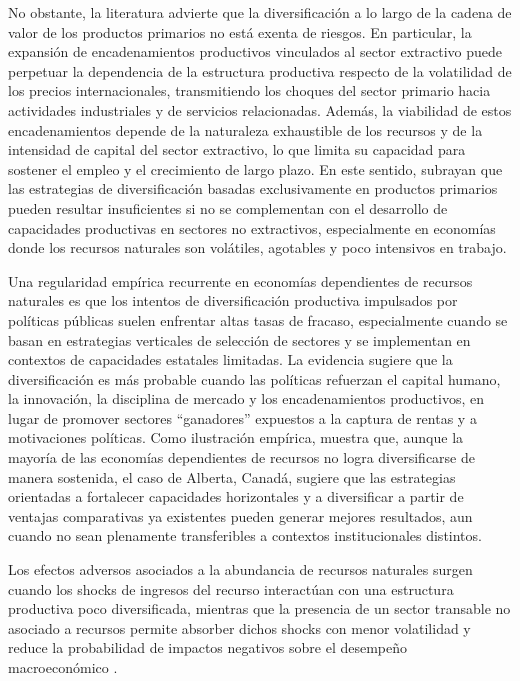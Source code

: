 \documentclass[../../TFM.tex]{subfiles}
\begin{document}
	No obstante, la literatura advierte que la diversificación a lo largo de la cadena de valor de los productos primarios no está exenta de riesgos. En particular, la expansión de encadenamientos productivos vinculados al sector extractivo puede perpetuar la dependencia de la estructura productiva respecto de la volatilidad de los precios internacionales, transmitiendo los choques del sector primario hacia actividades industriales y de servicios relacionadas. Además, la viabilidad de estos encadenamientos depende de la naturaleza exhaustible de los recursos y de la intensidad de capital del sector extractivo, lo que limita su capacidad para sostener el empleo y el crecimiento de largo plazo. En este sentido, \textcite{Lebdioui2019} subrayan que las estrategias de diversificación basadas exclusivamente en productos primarios pueden resultar insuficientes si no se complementan con el desarrollo de capacidades productivas en sectores no extractivos, especialmente en economías donde los recursos naturales son volátiles, agotables y poco intensivos en trabajo.
	
	Una regularidad empírica recurrente en economías dependientes de recursos naturales es que los intentos de diversificación productiva impulsados por políticas públicas suelen enfrentar altas tasas de fracaso, especialmente cuando se basan en estrategias verticales de selección de sectores y se implementan en contextos de capacidades estatales limitadas. La evidencia sugiere que la diversificación es más probable cuando las políticas refuerzan el capital humano, la innovación, la disciplina de mercado y los encadenamientos productivos, en lugar de promover sectores “ganadores” expuestos a la captura de rentas y a motivaciones políticas. Como ilustración empírica, \textcite{Howie2018} muestra que, aunque la mayoría de las economías dependientes de recursos no logra diversificarse de manera sostenida, el caso de Alberta, Canadá, sugiere que las estrategias orientadas a fortalecer capacidades horizontales y a diversificar a partir de ventajas comparativas ya existentes pueden generar mejores resultados, aun cuando no sean plenamente transferibles a contextos institucionales distintos.
	
	Los efectos adversos asociados a la abundancia de recursos naturales surgen cuando los shocks de ingresos del recurso interactúan con una estructura productiva poco diversificada, mientras que la presencia de un sector transable no asociado a recursos permite absorber dichos shocks con menor volatilidad y reduce la probabilidad de impactos negativos sobre el desempeño macroeconómico \parencite{Hausmann2002}.
	
\end{document}

